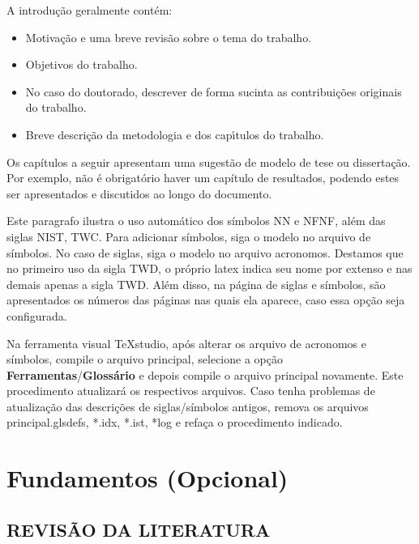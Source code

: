 A introdu\c{c}\~{a}o geralmente contém:

\begin{itemize}
    \item Motiva\c{c}\~{a}o e uma breve revis\~{a}o sobre o tema do trabalho.
    \item Objetivos do trabalho.
    \item No caso do doutorado, descrever de forma sucinta as contribui\c{c}\~{o}es originais do trabalho.
    \item Breve descri\c{c}\~{a}o da metodologia e dos cap\'{\i}tulos do trabalho.
\end{itemize}

Os capítulos a seguir apresentam uma sugestão de modelo de tese ou dissertação. Por exemplo, não é obrigatório haver um capítulo de resultados, podendo estes ser apresentados e discutidos ao longo do documento.

Este paragrafo ilustra o uso automático dos símbolos \gls{NN} e \gls{NFNF}, além das siglas \gls{NIST}, \gls{TWC}. Para adicionar símbolos, siga o modelo no arquivo de símbolos. No caso de siglas, siga o modelo no arquivo acronomos. Destamos que no primeiro uso da sigla \gls{TWD}, o próprio latex indica seu nome por extenso e nas demais apenas a sigla \gls{TWD}. Além disso, na página de siglas e símbolos, são apresentados os números das páginas nas quais ela aparece, caso essa opção seja configurada.

Na ferramenta visual TeXstudio, após alterar os arquivo de acronomos e símbolos, compile o arquivo principal, selecione a opção \textbf{Ferramentas}/\textbf{Glossário} e depois compile o arquivo principal novamente. Este procedimento atualizará os respectivos arquivos. Caso tenha problemas de atualização das descrições de siglas/símbolos antigos, remova os arquivos principal.glsdefs, *.idx, *.ist, *log e refaça o procedimento indicado.

	 
\nolinenumbers
\part{Fundamentos (Opcional)}
\linenumbers

%

\chapter{REVISÃO DA LITERATURA}
\label{cap:cap01}

